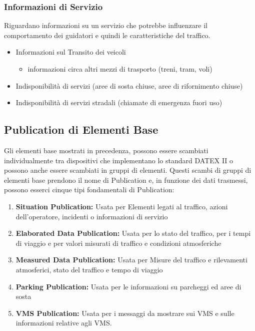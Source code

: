 \subsubsection{Informazioni di Servizio}
Riguardano informazioni su un servizio che potrebbe influenzare il comportamento dei guidatori e quindi le caratteristiche del traffico.
\begin{itemize}
	\item  Informazioni sul Transito dei veicoli
	\begin{itemize}
		\item informazioni circa altri mezzi di trasporto (treni, tram, voli)
	\end{itemize}
	\item Indisponibilità di servizi (aree di sosta chiuse, aree di rifornimento chiuse)
	\item Indisponibilità di servizi stradali (chiamate di emergenza fuori uso)
\end{itemize}

\subsection{Publication di Elementi Base}
\label{sec:publication_base_element}
Gli elementi base mostrati in precedenza, possono essere scambiati individualmente tra dispositivi che implementano lo standard DATEX II o possono anche essere scambiati in gruppi di elementi. Questi scambi di gruppi di elementi base prendono il nome di Publication e, in funzione dei dati trasmessi, possono esserci cinque tipi fondamentali di Publication:
\begin{enumerate}
	\item \textbf{Situation Publication: } Usata per Elementi legati al traffico, azioni dell'operatore, incidenti o informazioni di servizio
	\item \textbf{Elaborated Data Publication: } Usata per lo stato del traffico, per i tempi di viaggio e per valori misurati di traffico e condizioni atmosferiche
	\item \textbf{Measured Data Publication: } Usata per Misure del traffico e rilevamenti atmosferici, stato del traffico e tempo di viaggio
	\item \textbf{Parking Publication: } Usata per le informazioni su parcheggi ed aree di sosta
	\item \textbf{VMS Publication: } Usata per i messaggi da mostrare sui VMS e sulle informazioni relative agli VMS.
\end{enumerate}

